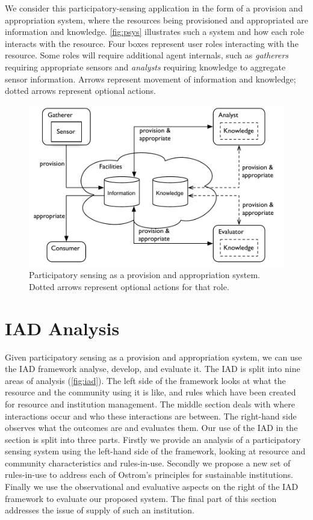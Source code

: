 We consider this participatory-sensing application in the form of a provision and appropriation system, where the resources being provisioned and appropriated are information and knowledge. \autoref{fig:psys} illustrates such a system and how each role interacts with the resource. Four boxes represent user roles interacting with the resource. Some roles will require additional agent internals, such as \emph{gatherers} requiring appropriate sensors and \emph{analysts} requiring knowledge to aggregate sensor information. Arrows represent movement of information and knowledge; dotted arrows represent optional actions.

\begin{figure}
\caption[Participatory sensing as a provision and appropriation system]{Participatory sensing as a provision and appropriation system. Dotted arrows represent optional actions for that role.}\label{fig:psys}
\includegraphics[width=\linewidth]{gfx/Prov_and_app_sys_diag}
\end{figure}

\section{IAD Analysis}

Given participatory sensing as a provision and appropriation system, we can use the \ac{IAD} framework analyse, develop, and evaluate it. 
The \ac{IAD} is split into nine areas of analysis (\autoref{fig:iad}). 
The left side of the framework looks at what the resource and the community using it is like, and rules which have been created for resource and institution management. 
The middle section deals with where interactions occur and who these interactions are between. 
The right-hand side observes what the outcomes are and evaluates them.
Our use of the \ac{IAD} in the section is split into three parts.
Firstly we provide an analysis of a participatory sensing system using the left-hand side of the framework, looking at resource and community characteristics and rules-in-use. 
Secondly we propose a new set of rules-in-use to address each of Ostrom's principles for sustainable institutions. 
Finally we use the observational and evaluative aspects on the right of the \ac{IAD} framework to evaluate our proposed system.
The final part of this section addresses the issue of supply of such an institution.

